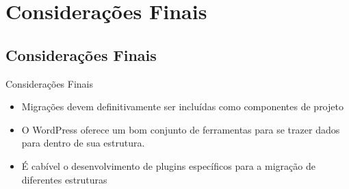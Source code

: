 \documentclass[handout]{beamer}
\begin{document}
\section{Considerações Finais}
\subsection{Considerações Finais}

\begin{frame}{Considerações Finais}
  \begin{itemize}
    \item Migrações devem definitivamente ser incluídas como
          componentes de projeto
    \item O WordPress oferece um bom conjunto de ferramentas
          para se trazer dados para dentro de sua estrutura.
    \item É cabível o desenvolvimento de plugins específicos
          para a migração de diferentes estruturas
  \end{itemize}
\end{frame}
\end{document}
